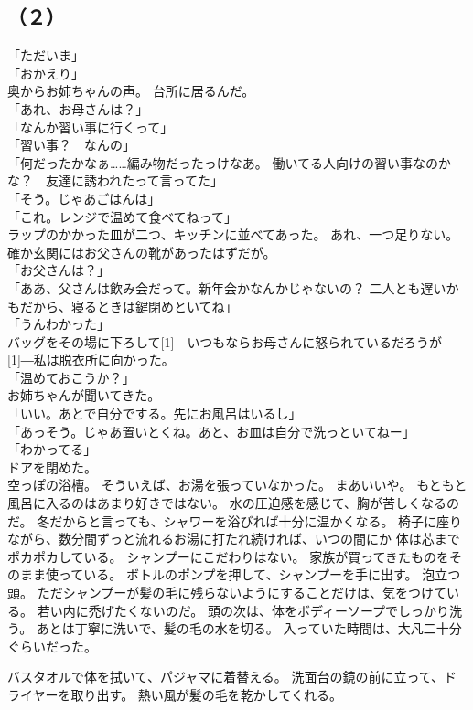 \documentclass[../IHMain]{subfiles}
\begin{document}
\subsection*{（２）}
「ただいま」\\
「おかえり」\\
奥からお姉ちゃんの声。
台所に居るんだ。\\
「あれ、お母さんは？」\\
「なんか習い事に行くって」\\
「習い事？　なんの」\\
「何だったかなぁ……編み物だったっけなあ。
働いてる人向けの習い事なのかな？　友達に誘われたって言ってた」\\
「そう。じゃあごはんは」\\
「これ。レンジで温めて食べてねって」\\
ラップのかかった皿が二つ、キッチンに並べてあった。
あれ、一つ足りない。
確か玄関にはお父さんの靴があったはずだが。\\
「お父さんは？」\\
「ああ、父さんは飲み会だって。新年会かなんかじゃないの？
二人とも遅いかもだから、寝るときは鍵閉めといてね」\\
「うんわかった」\\
バッグをその場に下ろして\scalebox{3}[1]{―}いつもならお母さんに怒られているだろうが
\scalebox{3}[1]{―}私は脱衣所に向かった。\\
「温めておこうか？」\\
お姉ちゃんが聞いてきた。\\
「いい。あとで自分でする。先にお風呂はいるし」\\
「あっそう。じゃあ置いとくね。あと、お皿は自分で洗っといてねー」\\
「わかってる」\\
ドアを閉めた。\\
空っぽの浴槽。
そういえば、お湯を張っていなかった。
まあいいや。
もともと風呂に入るのはあまり好きではない。
水の圧迫感を感じて、胸が苦しくなるのだ。
冬だからと言っても、シャワーを浴びれば十分に温かくなる。
椅子に座りながら、数分間ずっと流れるお湯に打たれ続ければ、いつの間にか
体は芯までポカポカしている。
シャンプーにこだわりはない。
家族が買ってきたものをそのまま使っている。
ボトルのポンプを押して、シャンプーを手に出す。
泡立つ頭。
ただシャンプーが髪の毛に残らないようにすることだけは、気をつけている。
若い内に禿げたくないのだ。
頭の次は、体をボディーソープでしっかり洗う。
あとは丁寧に洗いで、髪の毛の水を切る。
入っていた時間は、大凡二十分ぐらいだった。

バスタオルで体を拭いて、パジャマに着替える。
洗面台の鏡の前に立って、ドライヤーを取り出す。
熱い風が髪の毛を乾かしてくれる。
\end{document}
